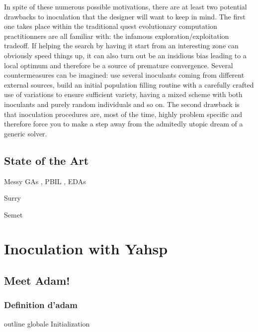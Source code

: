 \documentclass[english]{DESCARWINreport}
\begin{document}
In spite of these numerous possible motivations, there are at least two potential drawbacks to inoculation that the designer will want to keep in mind. The first one takes place within the traditional quest evolutionary computation practitionners are all familiar with: the infamous exploration/exploitation tradeoff. If helping the search by having it start from an interesting zone can obviously speed things up, it can also turn out be an insidious bias leading to a local optimum and therefore be a source of premature convergence. Several countermeasures can be imagined: use several inoculants coming from different external sources, build an initial population filling routine with a carefully crafted use of variations to ensure sufficient variety, having a mixed scheme with both inoculants and purely random individuals and so on. The second drawback is that inoculation procedures are, most of the time, highly problem specific and therefore force you to make a step away from the admitedly utopic dream of a generic solver.




\section{State of the Art}

Messy GAs \cite{Kargupta95search}, PBIL \cite{Baluja95removingthe}, EDAs \cite{Larranaga:2002b}

Surry \cite{Surry96, SurryPhD}

Semet \cite{semetGECCO06}

\newpage
\chapter{Inoculation with Yahsp}

\section{Meet Adam!}

\subsection{Definition d'adam}

outline globale Initialization
\end{document}

